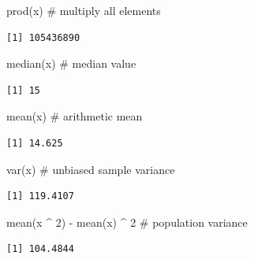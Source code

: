 \documentclass[
  letterpaper,
  DIV=11,
  numbers=noendperiod]{scrreprt}
\newenvironment{Shaded}{\begin{snugshade}}{\end{snugshade}}
\newcommand{\CommentTok}[1]{\textcolor[rgb]{0.37,0.37,0.37}{#1}}
\newcommand{\DecValTok}[1]{\textcolor[rgb]{0.68,0.00,0.00}{#1}}
\newcommand{\FunctionTok}[1]{\textcolor[rgb]{0.28,0.35,0.67}{#1}}
\newcommand{\NormalTok}[1]{\textcolor[rgb]{0.00,0.23,0.31}{#1}}
\newcommand{\SpecialCharTok}[1]{\textcolor[rgb]{0.37,0.37,0.37}{#1}}
\begin{document}
\begin{Shaded}
\begin{Highlighting}[]
\FunctionTok{prod}\NormalTok{(x) }\CommentTok{\# multiply all elements}
\end{Highlighting}
\end{Shaded}

\begin{verbatim}
[1] 105436890
\end{verbatim}

\begin{Shaded}
\begin{Highlighting}[]
\FunctionTok{median}\NormalTok{(x) }\CommentTok{\# median value}
\end{Highlighting}
\end{Shaded}

\begin{verbatim}
[1] 15
\end{verbatim}

\begin{Shaded}
\begin{Highlighting}[]
\FunctionTok{mean}\NormalTok{(x) }\CommentTok{\# arithmetic mean}
\end{Highlighting}
\end{Shaded}

\begin{verbatim}
[1] 14.625
\end{verbatim}

\begin{Shaded}
\begin{Highlighting}[]
\FunctionTok{var}\NormalTok{(x) }\CommentTok{\# unbiased sample variance}
\end{Highlighting}
\end{Shaded}

\begin{verbatim}
[1] 119.4107
\end{verbatim}

\begin{Shaded}
\begin{Highlighting}[]
\FunctionTok{mean}\NormalTok{(x }\SpecialCharTok{\^{}} \DecValTok{2}\NormalTok{) }\SpecialCharTok{{-}} \FunctionTok{mean}\NormalTok{(x) }\SpecialCharTok{\^{}} \DecValTok{2} \CommentTok{\# population variance}
\end{Highlighting}
\end{Shaded}

\begin{verbatim}
[1] 104.4844
\end{verbatim}
\end{document}
